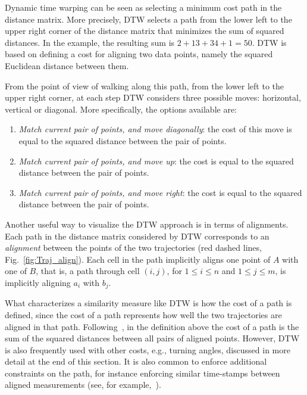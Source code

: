 \documentclass{interact}
\begin{document}

Dynamic time warping can be seen as selecting a minimum cost path in the distance matrix.
More precisely, DTW selects a path from the lower left to the upper right corner of the distance matrix that minimizes the sum of squared distances. In the example, the resulting sum is $2 + 13 + 34 + 1
 = 50$. DTW is based on defining a cost for aligning two data points, namely the squared Euclidean distance between them.

From the point of view of walking along this path, from the lower left to the upper right corner, at each step DTW considers three possible moves: horizontal, vertical or diagonal.  More specifically, the options available are:
\begin{enumerate}
\item \textit{Match current pair of points, and move diagonally}: the cost of this move is equal to the squared distance between the pair of points.
\item \textit{Match current pair of points, and move up}: the cost is equal to the squared distance between the pair of points.
\item \textit{Match current pair of points, and move right}: the cost is equal to the squared distance between the pair of points.
\end{enumerate}

Another useful way to visualize the DTW approach is in terms of alignments. Each path in the distance matrix considered by DTW corresponds to an \emph{alignment} between the points of the two trajectories (red dashed lines, Fig.~\ref{fig:Traj_align}). 
Each cell in the path implicitly aligns one point of $A$ with one of $B$, that is, a path  through cell $(i,j)$, for $1 \leq i \leq n$ and $1 \leq j \leq m$, is implicitly aligning $a_i$ with $b_j$.

What characterizes a similarity measure like DTW is how the cost of a path is defined, since the cost of a path represents how well the two trajectories are aligned in that path. 
Following~\cite{ChenOO05}, in the definition above the cost of a path is the sum of the squared distances between all pairs of aligned points. 
However, DTW is also frequently used with other costs, e.g., turning angles, discussed in more detail at the end of this section.
It is also common to enforce additional constraints on the path, for instance enforcing similar time-stamps between aligned measurements (see, for example,~\citealp{keogh2005exact}).
\end{document}
